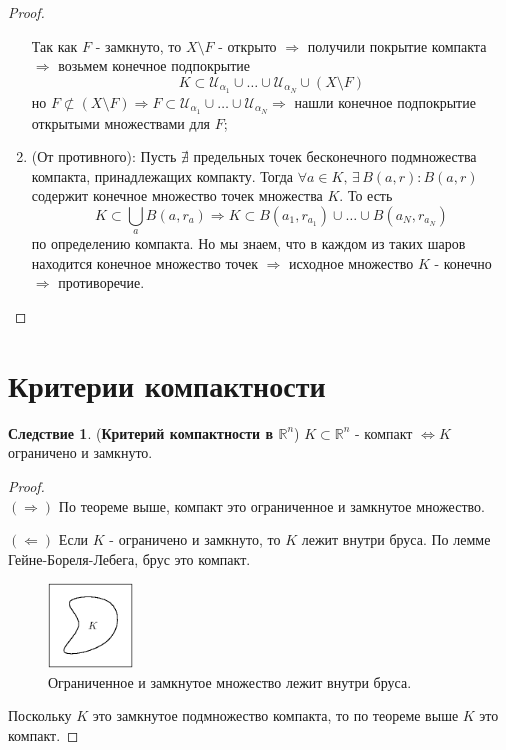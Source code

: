 \documentclass[12pt]{article}
\newcommand{\MR}{\mathbb{R}}
\newcommand{\MU}{\mathcal{U}}
\theoremstyle{definition}
\newtheorem{corollary}{Следствие}
\begin{document}
\begin{proof}
\begin{enumerate}[label ={(\arabic*)}]
		Так как $F$ - замкнуто, то $X \setminus F$ - открыто $\Rightarrow$ получили покрытие компакта $\Rightarrow$ возьмем конечное подпокрытие 
		$$
			K \subset \MU_{\alpha_1} \cup \dotsc \cup \MU_{\alpha_N} \cup (X \setminus F)
		$$ 
		но $F\not\subset (X\setminus F) \Rightarrow F \subset \MU_{\alpha_1} \cup \dotsc \cup \MU_{\alpha_N} \Rightarrow$ нашли конечное подпокрытие открытыми множествами для $F$;
		\item (От противного): Пусть $\nexists$ предельных точек бесконечного подмножества компакта, принадлежащих компакту. Тогда $\forall a \in K, \, \exists \, B(a,r)\colon B(a,r)$ содержит конечное множество точек множества $K$. То есть 
		$$
			K \subset \textstyle \bigcup\limits_a B(a,r_a) \Rightarrow K \subset B(a_1,r_{a_1}) \cup \dotsc \cup B(a_N, r_{a_N})
		$$ 
		по определению компакта. Но мы знаем, что в каждом из таких шаров находится конечное множество точек $\Rightarrow$ исходное множество $K$ - конечно $\Rightarrow$ противоречие. 	 	
	\end{enumerate}
	
\end{proof}

\section*{Критерии компактности}

\begin{corollary}(\textbf{Критерий компактности в $\MR^n$})
	$K\subset \MR^n$ - компакт $\Leftrightarrow K$ ограничено и замкнуто.
\end{corollary}
\begin{proof}\hfill\\
	$(\Rightarrow)$ По теореме выше, компакт это ограниченное и замкнутое множество.
	
	$(\Leftarrow)$ Если $K$ - ограничено и замкнуто, то $K$ лежит внутри бруса. По лемме Гейне-Бореля-Лебега, брус это компакт. 
	\begin{figure}[H]
		\centering
		\includegraphics[width=0.2\textwidth]{8_7.eps}
		\caption{Ограниченное и замкнутое множество лежит внутри бруса.}
		\label{8_7}
	\end{figure}
	Поскольку $K$ это замкнутое подмножество компакта, то по теореме выше $K$ это компакт.
\end{proof}
\end{document}
